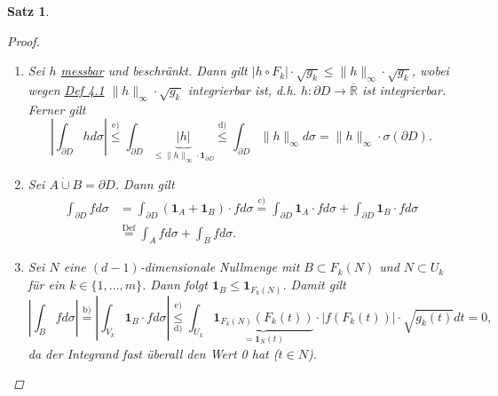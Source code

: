 \documentclass[a4paper]{report}
\newcommand{\doubleOne}{\textbf{1}}
\newcommand{\R}{\mathbb{R}}
\newcommand{\Rq}{\overline{\R}}
\newcommand{\dcup}{\dot{\cup}}
\newcommand{\overunderset}[3]{\overset{#1}{\underset{#3}{#2}}}
\newcommand{\jlabel}[1]{\label{j_#1}}
\newcommand{\jhyperref}[2]{\hyperref[j_#1]{#2}}
\newcommand{\jlink}[1]{\jhyperref{#1}{#1}}
\newcommand{\jabb}[3]{ #1: #2 \rightarrow #3 }
\newcommand{\jspacesmall}{\vspace{4pt}}
\newcommand{\jdate}[1]{\jspacesmall\begin{center}\jlabel{#1}\tiny{Ana III, #1}\end{center}}
\theoremstyle{plain}
\newtheorem{satz}[thm]{Satz}
\theoremstyle{definition}
\begin{document}
{{{{\begin{satz}
\begin{proof}
\begin{enumerate}
\jdate{19.01.2009}

            \item
                Sei $h$ \jlink{messbar} und beschränkt. Dann gilt $|h\circ F_k|\cdot \sqrt{g_k} \le \lVert h \rVert_\infty \cdot \sqrt{g_k}$, wobei wegen \jlink{Def 4.1} $\lVert h \rVert_\infty \cdot \sqrt{g_k}$ integrierbar ist, d.h. $\jabb{h}{\partial D}{\Rq}$ ist integrierbar. Ferner gilt
                \[
                    \left| \int_{\partial D} h d\sigma \right| \overset{\text{e)}}{\le} \int_{\partial D} \underbrace{|h|}_{\le \lVert h \rVert_\infty \cdot \doubleOne_{\partial D}} \overset{\text{d)}}{\le} \int_{\partial D} \lVert h \rVert_\infty d \sigma = \lVert h \rVert_\infty \cdot \sigma(\partial D).
                \]
                
            \item
                Sei $A \dcup B = \partial D$. Dann gilt
                \[
                    \begin{split}
                        \int_{\partial D} f d \sigma &= \int_{\partial D} \left( \doubleOne_A + \doubleOne_B \right)\cdot f d \sigma \overset{\text{c)}}{=} \int_{\partial D} \doubleOne_A \cdot f d\sigma + \int_{\partial D} \doubleOne_B \cdot f d\sigma\\
                        &\overset{\text{Def}}{=} \int_A f d\sigma + \int_B f d\sigma.
                    \end{split}
                \]

            \item
                Sei $N$ eine $(d-1)$-dimensionale Nullmenge mit $B\subset F_k(N)$ und $N\subset U_k$ für ein $k\in \{1,\dots,m\}$. Dann folgt $\doubleOne_B \le \doubleOne_{F_k(N)}$. Damit gilt
                \[
                    \left| \int_B f d\sigma \right| \overset{\text{b)}}{=} \left|\int_{V_k} \doubleOne_B\cdot f d\sigma \right| \overunderset{\text{e)}}{\le}{\text{d)}} \int_{U_k} \underbrace{\doubleOne_{F_k(N)}(F_k(t))}_{=\doubleOne_N(t)} \cdot |f(F_k(t))|\cdot \sqrt{g_k(t)} dt = 0,
                \]
                da der Integrand fast überall den Wert 0 hat ($t\in N$).
                

\end{enumerate}
\end{proof}
\end{satz}}}}}
\end{document}
